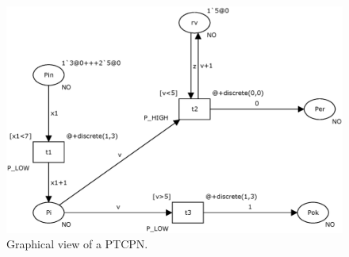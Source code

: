 \begin{figure}


\hspace*{1.0cm}
\includegraphics[width=11.5cm]{Figures/figure2_scp.eps}
% 
\caption{\label{red1}Graphical view of a PTCPN.}
\end{figure}

